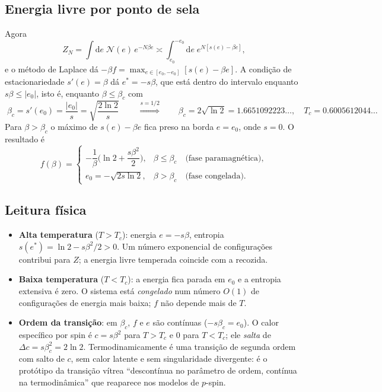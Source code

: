 \documentclass[11pt,a4paper]{article}
\newcommand{\dd}{\mathrm{d}}
\begin{document}
\subsection{Energia livre por ponto de sela}
Agora
\begin{equation}
  Z_N=\int\dd e\;\mathcal N(e)\,e^{-N\beta e}\asymp\int_{e_0}^{-e_0}\dd e\;e^{N[s(e)-\beta e]},
\end{equation}
e o método de Laplace dá $-\beta f=\max_{e\in[e_0,-e_0]}[s(e)-\beta e]$. A condição de estacionariedade
$s'(e)=\beta$ dá $e^*=-s\beta$, que está dentro do intervalo enquanto $s\beta\le|e_0|$, isto é,
enquanto $\beta\le\beta_c$ com
\begin{equation}
  \boxed{\;\beta_c=s'(e_0)=\frac{|e_0|}{s}=\sqrt{\frac{2\ln2}{s}}\;}
  \qquad\stackrel{s=1/2}{\Longrightarrow}\qquad
  \beta_c=2\sqrt{\ln2}=1.6651092223\ldots,\quad T_c=0.6005612044\ldots
\end{equation}
Para $\beta>\beta_c$ o máximo de $s(e)-\beta e$ fica preso na borda $e=e_0$, onde $s=0$. O resultado é
\begin{equation}
  \boxed{\;
  f(\beta)=
  \begin{cases}
    -\dfrac{1}{\beta}\Big(\ln2+\dfrac{s\beta^2}{2}\Big), & \beta\le\beta_c\quad\text{(fase paramagnética)},\\[3mm]
    e_0=-\sqrt{2s\ln2}, & \beta>\beta_c\quad\text{(fase congelada)}.
  \end{cases}\;}
  \label{eq:f-exata}
\end{equation}

\subsection{Leitura física}
\begin{itemize}
\item \textbf{Alta temperatura} ($T>T_c$): energia $e=-s\beta$, entropia $s(e^*)=\ln2-s\beta^2/2>0$. Um número
exponencial de configurações contribui para $Z$; a energia livre temperada coincide com a recozida.
\item \textbf{Baixa temperatura} ($T<T_c$): a energia fica parada em $e_0$ e a entropia extensiva é zero.
O sistema está \emph{congelado} num número $O(1)$ de configurações de energia mais baixa; $f$ não depende
mais de $T$.
\item \textbf{Ordem da transição}: em $\beta_c$, $f$ e $e$ são contínuas
($-s\beta_c=e_0$). O calor específico por spin é $c=s\beta^2$ para $T>T_c$ e $0$ para $T<T_c$; ele
\emph{salta} de $\Delta c=s\beta_c^2=2\ln2$. Termodinamicamente é uma transição de segunda ordem com salto
de $c$, sem calor latente e sem singularidade divergente: é o protótipo da transição vítrea
``descontínua no parâmetro de ordem, contínua na termodinâmica'' que reaparece nos modelos de $p$-spin.
\end{itemize}
\end{document}
